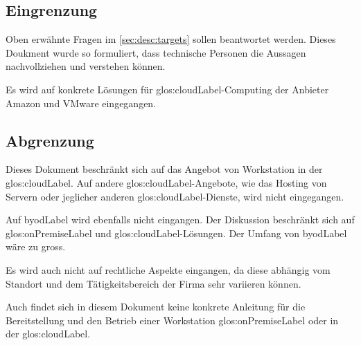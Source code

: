 \subsection{Eingrenzung}

Oben erwähnte Fragen im \cref{sec:desc:targets} sollen beantwortet werden.
Dieses Doukment wurde so formuliert, dass technische Personen die Aussagen nachvollziehen und verstehen können.

Es wird auf konkrete Lösungen für \Gls{glos:cloudLabel}-Computing der Anbieter Amazon und VMware eingegangen.

\subsection{Abgrenzung}
Dieses Dokument beschränkt sich auf das Angebot von Workstation in der \Gls{glos:cloudLabel}. Auf andere \Gls{glos:cloudLabel}-Angebote, wie das Hosting von Servern oder jeglicher anderen \Gls{glos:cloudLabel}-Dienste, wird nicht eingegangen.

Auf \Gls{byodLabel} wird ebenfalls nicht eingangen. Der Diskussion beschränkt sich auf \gls{glos:onPremiseLabel} und \Gls{glos:cloudLabel}-Lösungen. Der Umfang von \Gls{byodLabel} wäre zu gross.

Es wird auch nicht auf rechtliche Aspekte eingangen, da diese abhängig vom Standort und dem Tätigkeitsbereich der Firma sehr variieren können.

Auch findet sich in diesem Dokument keine konkrete Anleitung für die Bereitstellung und den Betrieb einer Workstation \gls{glos:onPremiseLabel} oder in der \Gls{glos:cloudLabel}.

